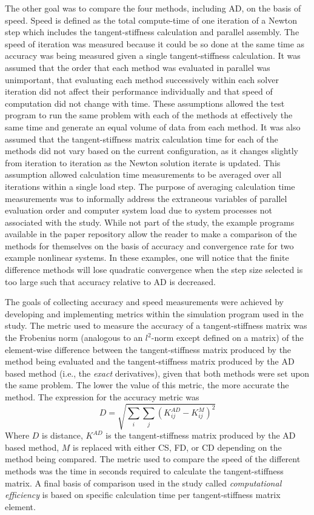 \documentclass[preprint,12pt]{elsarticle}
\begin{document}
The other goal was to compare the four methods, including AD, on the basis of
speed. Speed is defined as the total compute-time of one iteration of a Newton
step which includes the tangent-stiffness calculation and parallel assembly.
The speed of iteration was measured because it could be so done at the same
time as accuracy was being measured given a single tangent-stiffness
calculation.  It was assumed that the order that each method was evaluated in
parallel was unimportant, that evaluating each method successively within each
solver iteration did not affect their performance individually and that speed
of computation did not change with time. These assumptions allowed the test
program to run the same problem with each of the methods at effectively the
same time and generate an equal volume of data from each method. It was also
assumed that the tangent-stiffness matrix calculation time for each of the
methods did not vary based on the current configuration, as it changes slightly
from iteration to iteration as the Newton solution iterate is updated.  This
assumption allowed calculation time measurements to be averaged over all
iterations within a single load step. The purpose of averaging calculation time
measurements was to informally address the extraneous variables of parallel
evaluation order and computer system load due to system processes not
associated with the study. While not part of the study, the example programs
available in the paper repository allow the reader to make a comparison of the
methods for themselves on the basis of accuracy and convergence rate for two
example nonlinear systems. In these examples, one will notice that the finite
difference methods will lose quadratic convergence when the step size selected
is too large such that accuracy relative to AD is decreased.

The goals of collecting accuracy and speed measurements were achieved by
developing and implementing metrics within the simulation program used in the
study. The metric used to measure the accuracy of a tangent-stiffness matrix
was the Frobenius norm (analogous to an $l^2$-norm except defined on a matrix)
of the element-wise difference between the tangent-stiffness matrix produced by
the method being evaluated and the tangent-stiffness matrix produced by the AD
based method (i.e., the \emph{exact} derivatives), given that both methods were
set upon the same problem. The lower the value of this metric, the more
accurate the method. The expression for the accuracy metric was
%
\begin{equation} D = \sqrt{\sum_i \sum_j(K^{AD}_{ij} - K^{M}_{ij})^2}
\label{eqn:accuracy} \end{equation}
%
Where $D$ is distance, $K^{AD}$ is the tangent-stiffness matrix produced by the
AD based method, $M$ is replaced with either CS, FD, or CD depending on the
method being compared.  The metric used to compare the speed of the different
methods was the time in seconds required to calculate the tangent-stiffness
matrix. A final basis of comparison used in the study called
\emph{computational efficiency} is based on specific calculation time per
tangent-stiffness matrix element.
\end{document}
